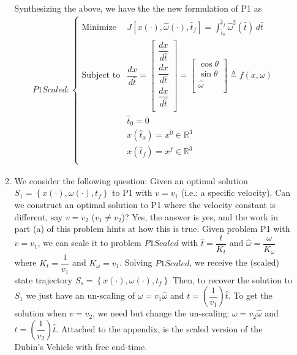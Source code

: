 \documentclass[10pt]{article}
\newcommand{\mat}[2][ccccccccccccccc]{\left [\!\!\begin{array}{#1} #2\\ \end{array} \!\!\right]}
\newcommand{\piece}[2][cll]{\left \{\begin{array}{#1} #2\\ \end{array} \right. }
\newcommand{\dint}{\displaystyle\int}
\newcommand{\pdfrac}[2]{\!\left(\dfrac{#1}{#2}\right)\! }
\newcommand{\libz}[2]{\dfrac{d #1}{d #2} }
\newcommand{\cbrace}[1]{\left\{#1\right\}}				%
\newcommand{\bbr}{\mathbb{R}}
\begin{document}
\begin{enumerate}[leftmargin=*]
\begin{enumerate}
          Synthesizing the above, we have the the new formulation of P1 as
          \begin{align*}
            P1Scaled : \piece{ \text{Minimize} & J[x(\cdot), \hat\omega(\cdot), \hat t_f]
                                                     = \dint_{\hat t_0}^{\hat t_f}\hat\omega^2(\hat t) \,d\hat t \\
                    \text{Subject to} & \libz{x}{\hat t}= \mat{\libz{x}{\hat t} \\ \libz{x}{\hat t}\\ \libz{x}{\hat t}}
                                               = \mat{\cos\theta \\ \sin\theta \\ \hat\omega}\triangleq f(x,\omega) \\
                     & \hat t_0 = 0 \\
                     & x(\hat t_0)=x^0\in\bbr^3 \\
                     & x(\hat t_f)=x^f\in\bbr^3
                        }
          \end{align*}
      \item  We consider the following question: Given an optimal solution $S_1 = \cbrace{x(\cdot), \omega(\cdot), t_f}$ to P1 with $v=v_1$ (i.e.: a specific velocity).  Can we construct an optimal solution to P1 where the velocity constant is different, say $v=v_2$ ($v_1\neq v_2$)?  Yes, the answer is yes, and the work in part (a) of this problem hints at how this is true.  Given problem P1 with $v=v_1$, we can scale it to problem $P1Scaled$ with $\hat t = \dfrac{t}{K_t}$ and $\hat\omega=\dfrac{\omega}{K_\omega}$ where $K_t=\dfrac{1}{v_1}$ and $K_\omega=v_1$.  Solving $P1Scaled$, we receive the (scaled) state trajectory $S_s = \cbrace{x(\cdot), \omega(\cdot), t_f}$  Then, to recover the solution to $S_1$ we just have an un-scaling of $\omega = v_1\hat\omega$ and $t = \pdfrac{1}{v_1}\hat t$.  To get the solution when $v=v_2$, we need but change the un-scaling: $\omega = v_2\hat\omega$ and $t = \pdfrac{1}{v_2}\hat t$.   Attached to the appendix, is the scaled version of the Dubin's Vehicle with free end-time.
    \end{enumerate}



\end{enumerate}
\end{document}
